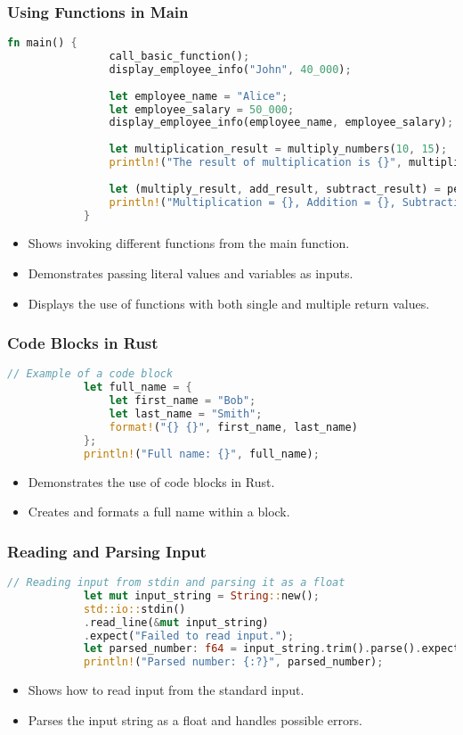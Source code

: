 \documentclass[aspectratio=169, table]{beamer}
\begin{document}
	\begin{frame}[fragile]
		\frametitle{Using Functions in Main}
		\begin{lstlisting}[language=Rust]
			fn main() {
				call_basic_function(); 
				display_employee_info("John", 40_000); 
				
				let employee_name = "Alice";
				let employee_salary = 50_000;
				display_employee_info(employee_name, employee_salary); 
				
				let multiplication_result = multiply_numbers(10, 15);
				println!("The result of multiplication is {}", multiplication_result);
				
				let (multiply_result, add_result, subtract_result) = perform_operations(10, 15);
				println!("Multiplication = {}, Addition = {}, Subtraction = {}", multiply_result, add_result, subtract_result);
			}
		\end{lstlisting}
		\begin{itemize}
			\item Shows invoking different functions from the main function.
			\item Demonstrates passing literal values and variables as inputs.
			\item Displays the use of functions with both single and multiple return values.
		\end{itemize}
	\end{frame}
	
	\begin{frame}[fragile]
		\frametitle{Code Blocks in Rust}
		\begin{lstlisting}[language=Rust]
			// Example of a code block
			let full_name = {
				let first_name = "Bob";
				let last_name = "Smith";
				format!("{} {}", first_name, last_name)
			};
			println!("Full name: {}", full_name);
		\end{lstlisting}
		\begin{itemize}
			\item Demonstrates the use of code blocks in Rust.
			\item Creates and formats a full name within a block.
		\end{itemize}
	\end{frame}
	
	\begin{frame}[fragile]
		\frametitle{Reading and Parsing Input}
		\begin{lstlisting}[language=Rust]
			// Reading input from stdin and parsing it as a float
			let mut input_string = String::new();
			std::io::stdin()
			.read_line(&mut input_string)
			.expect("Failed to read input.");
			let parsed_number: f64 = input_string.trim().parse().expect("Invalid input");
			println!("Parsed number: {:?}", parsed_number);
		\end{lstlisting}
		\begin{itemize}
			\item Shows how to read input from the standard input.
			\item Parses the input string as a float and handles possible errors.
		\end{itemize}
	\end{frame}
	
\end{document}
